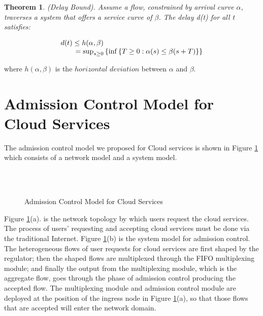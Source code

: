 \documentclass[a4paper]{article}
\newtheorem{theorem}{Theorem}
\begin{document}
\begin{theorem}
(Delay Bound). Assume a flow, constrained by arrival curve $\alpha$, traverses a system that offers a service curve of $\beta$. The  delay d(t) for all t satisfies:

\begin{equation}\label{}
  \begin{array}{l}
    d(t) \le h(\alpha ,\beta )\\
    {\kern 1pt} {\kern 1pt} {\kern 1pt} {\kern 1pt} {\kern 1pt} {\kern 1pt} {\kern 1pt} {\kern 1pt} {\kern 1pt} {\kern 1pt} {\kern 1pt} {\kern 1pt} {\kern 1pt} {\kern 1pt} {\kern 1pt} {\kern 1pt} {\kern 1pt} {\kern 1pt}  = {\sup _{s \ge 0}}\left\{ {\inf \left\{ {T \ge 0:\alpha (s) \le \beta (s + T)} \right\}} \right\}
  \end{array}
\end{equation}

\end{theorem}

\noindent where $h(\alpha ,\beta )$ is the $horizontal$ $deviation$ between $\alpha$ and $\beta$.

\section{Admission Control Model for Cloud Services}

The admission control model we proposed for Cloud services is shown in Figure \ref{fig1} which consists of a network model and a system model.

\begin{figure}[h]
\centering
{}\\
\\
\caption{Admission Control Model for Cloud Services}
\label{fig1}
\end{figure}

Figure \ref{fig1}(a). is the network topology by which users request the cloud services. The process of users’ requesting and accepting cloud services must be done via the traditional Internet. Figure \ref{fig1}(b) is the system model for admission control. The heterogeneous flows of user requests for cloud services are first shaped by the regulator; then the shaped flows are multiplexed through the FIFO multiplexing module; and finally the output from the multiplexing module, which is the aggregate flow, goes through the phase of admission control producing the accepted flow. The multiplexing module and admission control module are deployed at the position of the ingress node in Figure \ref{fig1}(a), so that those flows that are accepted will enter the network domain.
\end{document}
